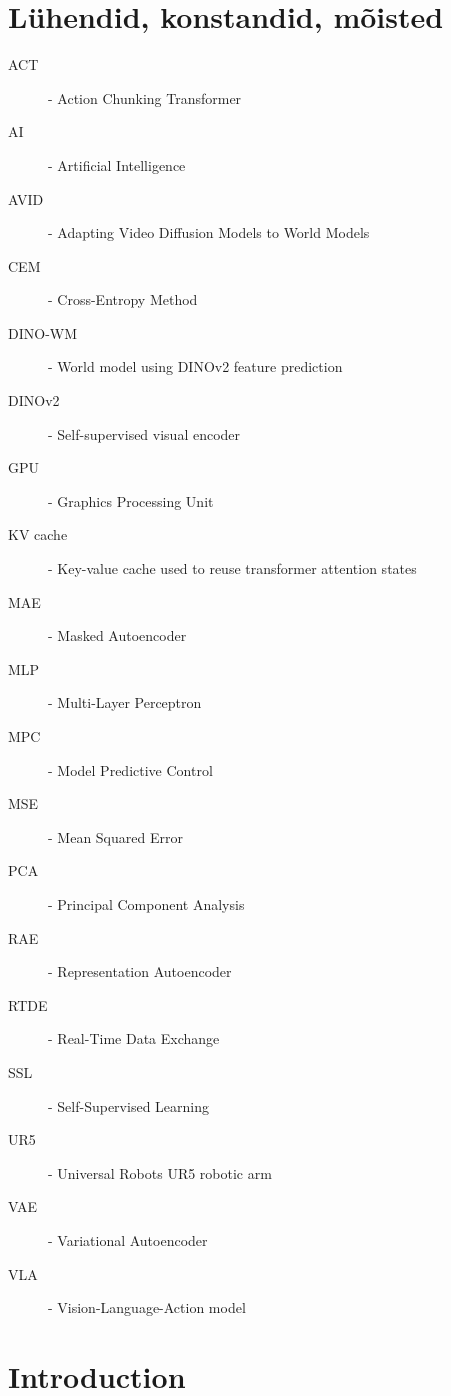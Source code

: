 \documentclass[12pt]{report}
\begin{document}
\chapter*{L\"uhendid, konstandid, m\~oisted}
\begin{description}
\item[ACT] - Action Chunking Transformer
\item[AI] - Artificial Intelligence
\item[AVID] - Adapting Video Diffusion Models to World Models
\item[CEM] - Cross-Entropy Method
\item[DINO-WM] - World model using DINOv2 feature prediction
\item[DINOv2] - Self-supervised visual encoder
\item[GPU] - Graphics Processing Unit
\item[KV cache] - Key-value cache used to reuse transformer attention states
\item[MAE] - Masked Autoencoder
\item[MLP] - Multi-Layer Perceptron
\item[MPC] - Model Predictive Control
\item[MSE] - Mean Squared Error
\item[PCA] - Principal Component Analysis
\item[RAE] - Representation Autoencoder
\item[RTDE] - Real-Time Data Exchange
\item[SSL] - Self-Supervised Learning
\item[UR5] - Universal Robots UR5 robotic arm
\item[VAE] - Variational Autoencoder
\item[VLA] - Vision-Language-Action model
\end{description}

\chapter{Introduction}
\end{document}
